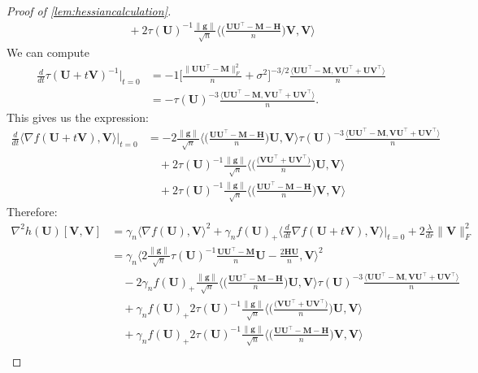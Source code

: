 \documentclass[10pt]{article}
\renewcommand{\t}{^{\top}}
\newcommand{\inv}{^{-1}}
\theoremstyle{definition}
\begin{document}
\begin{proof}[Proof of \cref{lem:hessiancalculation}]
\begin{align}
    &\quad + 2\tau(\bm{U})\inv \frac{\|\bm{g}\|}{\sqrt{n}}  \bigg\langle \bigg(  \frac{\bm{UU}\t - \bm{M}- \bm{H}}{n}  \bigg) \bm{V} , \bm{V} \bigg \rangle
\end{align}
We can compute
\begin{align}
    \frac{d}{dt} \tau(\bm{U} + t \bm{V} ) \inv \bigg|_{t=0} &= -1 \bigg[ \frac{\|\bm{UU}\t - \bm{M}\|_F^2}{n} + \sigma^2 \bigg]^{-3/2} \frac{\langle \bm{UU\t - M}, \bm{VU}\t + \bm{UV}\t \rangle}{n} \\
    &= - \tau(\bm{U})^{-3} \frac{\langle \bm{UU\t - M}, \bm{VU}\t + \bm{UV}\t \rangle}{n}.
\end{align}
This gives us the expression:
\begin{align}
      \frac{d}{dt}  \langle \nabla f(\bm{U} + t \bm{V}), \bm{V} \rangle \bigg|_{t=0} &= -2\frac{\|\bm{g}\|}{\sqrt{n}} \bigg\langle \bigg(\frac{ \bm{UU}\t  - \bm{M}- \bm{H}}{n}  \bigg)  \bm{U}  , \bm{V} \bigg \rangle \tau(\bm{U})^{-3} \frac{\langle \bm{UU\t - M}, \bm{VU}\t + \bm{UV}\t \rangle}{n} \\
    &\quad + 2\tau(\bm{U})\inv \frac{\|\bm{g}\|}{\sqrt{n}}  \bigg\langle \bigg(  \frac{\big(  \bm{VU}\t +  \bm{UV}\t \big) }{n}  \bigg)\bm{U}, \bm{V} \bigg \rangle \\
    &\quad + 2\tau(\bm{U})\inv \frac{\|\bm{g}\|}{\sqrt{n}}  \bigg\langle \bigg(  \frac{\bm{UU}\t - \bm{M}- \bm{H}}{n}  \bigg) \bm{V} , \bm{V} \bigg \rangle
\end{align}
Therefore:
\begin{align}
    \nabla^2 h(\bm{U})[\bm{V},\bm{V}] &= \gamma_n \bigg\langle \nabla f(\bm{U}), \bm{V} \bigg \rangle^2 + \gamma_n f(\bm{U})_+ \bigg\langle \frac{d}{dt} \nabla f(\bm{U} + t \bm{V}), \bm{V} \bigg \rangle \bigg|_{t=0} + 2 \frac{\lambda}{dr} \| \bm{V} \|_F^2 \\
    &= \gamma_n \bigg\langle 2 \frac{\|\bm{g}\|}{\sqrt{n}} \tau(\bm{U})\inv \frac{\bm{UU}\t - \bm{M}}{n} \bm{U} - \frac{2\bm{HU}}{n}, \bm{V} \bigg\rangle^2 \\
    &\quad - 2\gamma_n f(\bm{U})_+  \frac{\|\bm{g}\|}{\sqrt{n}} \bigg\langle \bigg(\frac{ \bm{UU}\t  - \bm{M}- \bm{H}}{n}  \bigg)  \bm{U}  , \bm{V} \bigg \rangle \tau(\bm{U})^{-3} \frac{\langle \bm{UU\t - M}, \bm{VU}\t + \bm{UV}\t \rangle}{n} \\
    &\quad +\gamma_n f(\bm{U})_+ 2\tau(\bm{U})\inv \frac{\|\bm{g}\|}{\sqrt{n}}  \bigg\langle \bigg(  \frac{\big(  \bm{VU}\t +  \bm{UV}\t \big) }{n}  \bigg)\bm{U}, \bm{V} \bigg \rangle \\
    &\quad +\gamma_n f(\bm{U})_+ 2\tau(\bm{U})\inv \frac{\|\bm{g}\|}{\sqrt{n}}  \bigg\langle \bigg(  \frac{\bm{UU}\t - \bm{M}- \bm{H}}{n}  \bigg) \bm{V} , \bm{V} \bigg \rangle \\

\end{align}
\end{proof}
\end{document}
